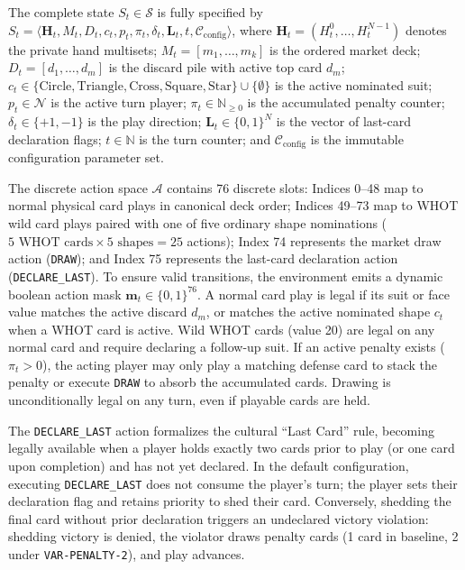 \documentclass[journal]{IEEEtran}
\begin{document}
The complete state $S_t \in \mathcal{S}$ is fully specified by $S_t = \langle \mathbf{H}_t, M_t, D_t, c_t, p_t, \pi_t, \delta_t, \mathbf{L}_t, t, \mathcal{C}_{\text{config}} \rangle$, where $\mathbf{H}_t = (H_t^0, \dots, H_t^{N-1})$ denotes the private hand multisets; $M_t = [m_1, \dots, m_k]$ is the ordered market deck; $D_t = [d_1, \dots, d_m]$ is the discard pile with active top card $d_m$; $c_t \in \{\text{Circle}, \text{Triangle}, \text{Cross}, \text{Square}, \text{Star}\} \cup \{\emptyset\}$ is the active nominated suit; $p_t \in \mathcal{N}$ is the active turn player; $\pi_t \in \mathbb{N}_{\ge 0}$ is the accumulated penalty counter; $\delta_t \in \{+1, -1\}$ is the play direction; $\mathbf{L}_t \in \{0, 1\}^N$ is the vector of last-card declaration flags; $t \in \mathbb{N}$ is the turn counter; and $\mathcal{C}_{\text{config}}$ is the immutable configuration parameter set.

The discrete action space $\mathcal{A}$ contains 76 discrete slots: Indices 0--48 map to normal physical card plays in canonical deck order; Indices 49--73 map to WHOT wild card plays paired with one of five ordinary shape nominations ($5 \text{ WHOT cards} \times 5 \text{ shapes} = 25$ actions); Index 74 represents the market draw action (\texttt{DRAW}); and Index 75 represents the last-card declaration action (\texttt{DECLARE\_LAST}). To ensure valid transitions, the environment emits a dynamic boolean action mask $\mathbf{m}_t \in \{0, 1\}^{76}$. A normal card play is legal if its suit or face value matches the active discard $d_m$, or matches the active nominated shape $c_t$ when a WHOT card is active. Wild WHOT cards (value 20) are legal on any normal card and require declaring a follow-up suit. If an active penalty exists ($\pi_t > 0$), the acting player may only play a matching defense card to stack the penalty or execute \texttt{DRAW} to absorb the accumulated cards. Drawing is unconditionally legal on any turn, even if playable cards are held.

The \texttt{DECLARE\_LAST} action formalizes the cultural ``Last Card'' rule, becoming legally available when a player holds exactly two cards prior to play (or one card upon completion) and has not yet declared. In the default configuration, executing \texttt{DECLARE\_LAST} does not consume the player's turn; the player sets their declaration flag and retains priority to shed their card. Conversely, shedding the final card without prior declaration triggers an undeclared victory violation: shedding victory is denied, the violator draws penalty cards (1 card in baseline, 2 under \texttt{VAR-PENALTY-2}), and play advances.
\end{document}
